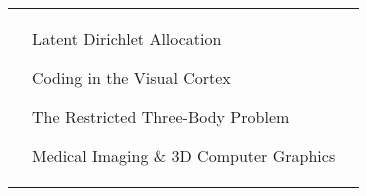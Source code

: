 \documentclass[letterpaper, 10pt]{article}
\begin{document}
\begin{tabularx}{\linewidth}{>{\raggedleft}p{2.2cm}|X X}
\begin{compact}
	\vspace{-\baselineskip}
\end{compact}&
\begin{compact}
	\vspace{-.5\baselineskip}
    \item Latent Dirichlet Allocation
    \item Coding in the Visual Cortex
    \item The Restricted Three-Body Problem
    \item Medical Imaging \& 3D Computer Graphics
	\vspace{-\baselineskip}
\end{compact}\\
\end{tabularx}

\end{document}
